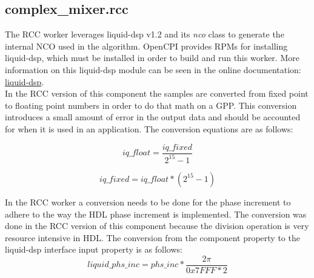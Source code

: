 \documentclass{article}
\def\comp{complex\_mixer}
\begin{document}
\subsection*{\comp.rcc}
\begin{flushleft}
The RCC worker leverages liquid-dsp v1.2 and its \textit{nco} class to generate the internal NCO used in the algorithm. OpenCPI provides RPMs for installing liquid-dsp, which must be installed in order to build and run this worker.  More information on this liquid-dsp module can be seen in the online documentation: \href{http://liquidsdr.org/doc/nco/}{liquid-dsp}.  \\
	In the RCC version of this component the samples are converted from fixed point to floating point numbers in order to do that math on a GPP. This conversion introduces a small amount of error in the output data and should be accounted for when it is used in an application.  The conversion equations are as follows:

	\begin{equation} \label{eq:iq_float}
  		iq\_float = \frac{iq\_fixed}{2^{15} -1}
	\end{equation}

    \begin{equation} \label{eq:iq_fixed}
  		iq\_fixed = {iq\_float}*(2^{15} -1)
	\end{equation}

	In the RCC worker a conversion needs to be done for the phase increment to adhere to the way the HDL phase increment is implemented.  The conversion was done in the RCC version of this component because the division operation is very resource intensive in HDL.  The conversion from the component property to the liquid-dsp interface input property is as follows:
	\begin{equation} \label{eq:rcc_phase_inc}
  		liquid\_phs\_inc = phs\_inc*\frac{2\pi}{0x7FFF*2}
	\end{equation}
\end{flushleft}
\end{document}
